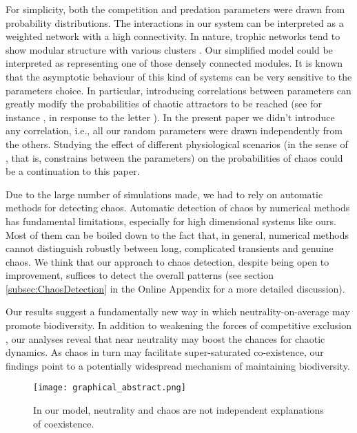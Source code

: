 For simplicity, both the competition and predation parameters were drawn from probability distributions. The interactions in our system can be interpreted as a weighted network with a high connectivity. In nature, trophic networks tend to show modular structure with various clusters \citep{Thebault2010}. Our simplified model could be interpreted as representing one of those densely connected modules. It is known that the asymptotic behaviour of this kind of systems can be very sensitive to the parameters choice. In particular, introducing correlations between parameters can greatly modify the probabilities of chaotic attractors to be reached (see for instance \citet{Huisman2001}, in response to the letter \citet{Schippers2001}). In the present paper we didn't introduce any correlation, i.e., all our random parameters were drawn independently from the others. Studying the effect of different physiological scenarios (in the sense of \citet{Huisman2001}, that is, constrains between the parameters) on the probabilities of chaos could be a continuation to this paper.

Due to the large number of simulations made, we had to rely on automatic methods for detecting chaos. Automatic detection of chaos by numerical methods has fundamental limitations, especially for high dimensional systems like ours. Most of them can be boiled down to the fact that, in general, numerical methods cannot distinguish robustly between long, complicated transients and genuine chaos. We think that our approach to chaos detection, despite being open to improvement, suffices to detect the overall patterns (see section \ref{subsec:ChaosDetection} in the Online Appendix for a more detailed discussion).

Our results suggest a fundamentally new way in which neutrality-on-average may promote biodiversity. In addition to weakening the forces of competitive exclusion \citep{Scheffer2018}, our analyses reveal that near neutrality may boost the chances for chaotic dynamics. As chaos in turn may facilitate super-saturated co-existence, our findings point to a potentially widespread mechanism of maintaining biodiversity.

\begin{figure}
	\begin{center}
		\texttt{[image: graphical\_abstract.png]}
	\end{center}
	\caption{In our model, neutrality and chaos are not independent explanations of coexistence.}
	\label{fig:GapInKnowledge}
\end{figure}
